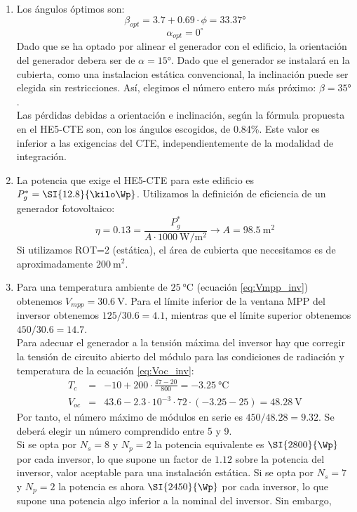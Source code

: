 \begin{enumerate}
\item Los ángulos óptimos son:
  \[
    \beta_{opt}=3.7+0.69\cdot\phi=\ang{33.37}
  \]
\[
  \alpha_{opt}=0^{\circ}
\]
Dado que se ha optado por alinear el generador con el edificio, la
orientación del generador debera ser de $\alpha=\ang{15}$. Dado
que el generador se instalará en la cubierta, como una instalacion
estática convencional, la inclinación puede ser elegida sin restricciones.
Así, elegimos el número entero más próximo: $\beta=\ang{35}$.\\
Las pérdidas debidas a orientación e inclinación, según la fórmula
propuesta en el HE5-CTE son, con los ángulos escogidos, de 0.84\%.
Este valor es inferior a las exigencias del CTE, independientemente
de la modalidad de integración.
\item La potencia que exige el HE5-CTE para este edificio es $P_{g}^{*}=\SI{12.8}{\kilo\Wp}$.
Utilizamos la definición de eficiencia de un generador fotovoltaico:\[
\eta=0.13=\frac{P_{g}^{*}}{A\cdot\SI{1000}{\watt\per\meter\squared}}\rightarrow A=\SI{98.5}{\meter\squared}\]
Si utilizamos ROT=2 (estática), el área de cubierta que necesitamos
es de aproximadamente $\SI{200}{\meter\squared}$.
\item Para una temperatura ambiente de $\qty{25}{\degreeCelsius}$ (ecuación \ref{eq:Vmpp_inv})
obtenemos $V_{mpp}=\SI{30.6}{\volt}$. Para el límite inferior de
la ventana MPP del inversor obtenemos $125/30.6=4.1$, mientras que
el límite superior obtenemos $450/30.6=14.7$. \\
Para adecuar el generador a la tensión máxima del inversor hay
que corregir la tensión de circuito abierto del módulo para las condiciones
de radiación y temperatura de la ecuación \ref{eq:Voc_inv}:\begin{eqnarray*}
T_{c} & = & -10+200\cdot\frac{47-20}{800}=\SI{-3.25}{\celsius}\\
V_{oc} & = & 43.6-2.3\cdot10^{-3}\cdot72\cdot(-3.25-25)=\SI{48.28}{\volt}\end{eqnarray*}
Por tanto, el número máximo de módulos en serie es $450/48.28=9.32$.
Se deberá elegir un número comprendido entre 5 y 9. \\
Si se opta por $N_{s}=8$ y $N_{p}=2$ la potencia equivalente
es $\SI{2800}{\Wp}$ por cada inversor, lo que supone un factor
de $1.12$ sobre la potencia del inversor, valor aceptable para una
instalación estática. Si se opta por $N_{s}=7$ y $N_{p}=2$ la potencia
es ahora $\SI{2450}{\Wp}$ por cada inversor, lo que supone
una potencia algo inferior a la nominal del inversor. Sin embargo,

\end{enumerate}
